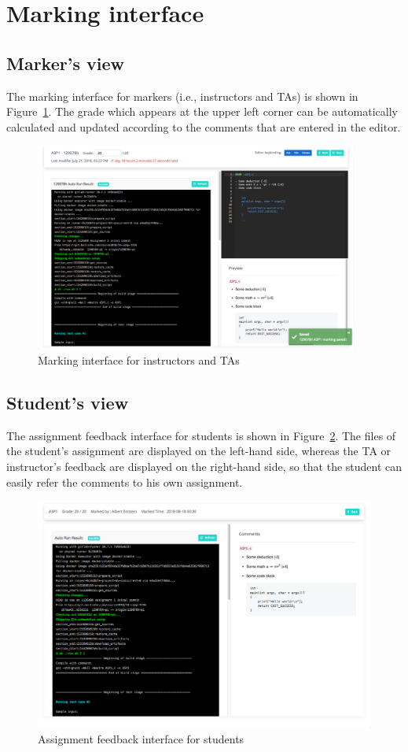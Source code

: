 \section{Marking interface}
\subsection{Marker's view}
The marking interface for markers (i.e., instructors and TAs) is shown in
Figure~\ref{fig:MARKING}. The grade which appears at the upper left corner can
be automatically calculated and updated according to the comments that are
entered in the editor.

\begin{figure}[H]
    \centering
        \includegraphics[width=0.95\textwidth]{figures/marker}
    \caption{Marking interface for instructors and TAs}
    \label{fig:MARKING}
\end{figure}

\subsection{Student's view}
The assignment feedback interface for students is shown in
Figure~\ref{fig:FEEDBACK}.
The files of the student's assignment are displayed on the left-hand side,
whereas the TA or instructor's feedback are displayed on the right-hand side,
so that the student can easily refer the comments to his own assignment.

\begin{figure}[H]
    \centering
        \includegraphics[width=1.0\textwidth]{figures/feedback}
    \caption{Assignment feedback interface for students}
    \label{fig:FEEDBACK}
\end{figure}